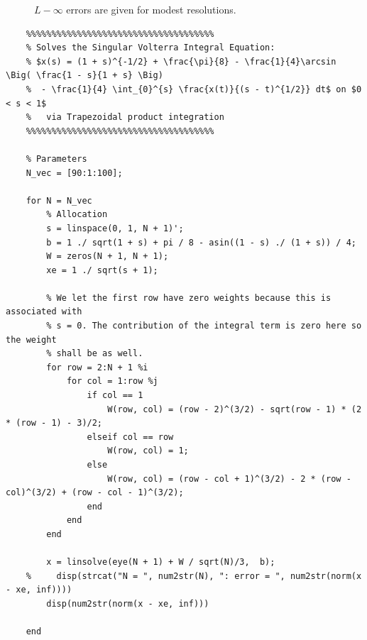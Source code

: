 \documentclass[10pt]{article}
\begin{document}
\begin{figure}[H]
    \centering
    \vspace{1cm}
    \caption{$L-\infty$ errors are given for modest resolutions.}
    \label{fig:err}
\end{figure}

\begin{lstlisting}
    %%%%%%%%%%%%%%%%%%%%%%%%%%%%%%%%%%%%%
    % Solves the Singular Volterra Integral Equation:
    % $x(s) = (1 + s)^{-1/2} + \frac{\pi}{8} - \frac{1}{4}\arcsin \Big( \frac{1 - s}{1 + s} \Big) 
    %  - \frac{1}{4} \int_{0}^{s} \frac{x(t)}{(s - t)^{1/2}} dt$ on $0 < s < 1$
    %   via Trapezoidal product integration
    %%%%%%%%%%%%%%%%%%%%%%%%%%%%%%%%%%%%%
    
    % Parameters
    N_vec = [90:1:100];
    
    for N = N_vec
        % Allocation
        s = linspace(0, 1, N + 1)';
        b = 1 ./ sqrt(1 + s) + pi / 8 - asin((1 - s) ./ (1 + s)) / 4;
        W = zeros(N + 1, N + 1);
        xe = 1 ./ sqrt(s + 1);
    
        % We let the first row have zero weights because this is associated with  
        % s = 0. The contribution of the integral term is zero here so the weight
        % shall be as well.
        for row = 2:N + 1 %i
            for col = 1:row %j
                if col == 1
                    W(row, col) = (row - 2)^(3/2) - sqrt(row - 1) * (2 * (row - 1) - 3)/2;
                elseif col == row
                    W(row, col) = 1;
                else
                    W(row, col) = (row - col + 1)^(3/2) - 2 * (row - col)^(3/2) + (row - col - 1)^(3/2);
                end
            end
        end
        
        x = linsolve(eye(N + 1) + W / sqrt(N)/3,  b);
    %     disp(strcat("N = ", num2str(N), ": error = ", num2str(norm(x - xe, inf))))
        disp(num2str(norm(x - xe, inf)))
        
    end
\end{lstlisting}
\end{document}
